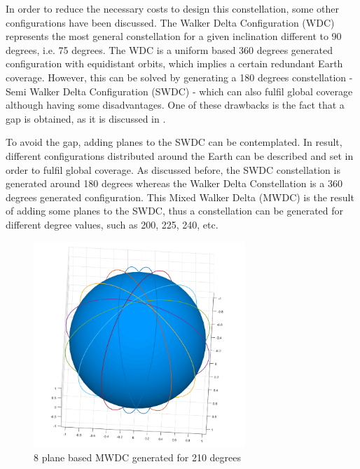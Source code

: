 In order to reduce the necessary costs to design this constellation, some other configurations have been discussed. The Walker Delta Configuration (WDC) represents the most general constellation for a given inclination different to 90 degrees, i.e. 75 degrees. The WDC is a uniform based 360 degrees generated configuration with equidistant orbits, which implies a certain redundant Earth coverage. However, this can be solved by generating a 180 degrees constellation - Semi Walker Delta Configuration (SWDC) - which can also fulfil global coverage although having some disadvantages. One of these drawbacks is the fact that a gap is obtained, as it is discussed in \cite[Chapter 3, Section 4]{annex1}.

To avoid the gap, adding planes to the SWDC can be contemplated. In result, different configurations distributed around the Earth can be described and set in order to fulfil global coverage. As discussed before, the SWDC constellation is generated around 180 degrees whereas the Walker Delta Constellation is a 360 degrees generated configuration. This Mixed Walker Delta (MWDC) is the result of adding some planes to the SWDC, thus a constellation can be generated for different degree values, such as 200, 225, 240, etc. 

\begin{figure}[h]
\includegraphics[width=8cm]{MWDC}
\centering
\caption{8 plane based MWDC generated for 210 degrees}
\end{figure}